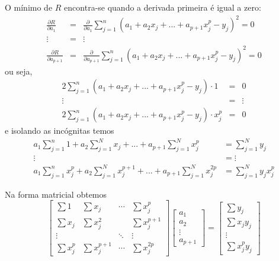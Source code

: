 O mínimo de $R$ encontra-se quando a derivada primeira é igual a zero:
\begin{eqnarray*}
  \frac{\partial R}{\partial a_1}     &=& \frac{\partial }{\partial a_1}     \sum_{j=1}^n (a_1 + a_2 x_j+...+a_{p+1}x_j^p-y_j)^2 =0 \\
  \vdots &=& \vdots \\
  \frac{\partial R}{\partial a_{p+1}} &=& \frac{\partial }{\partial a_{p+1}} \sum_{j=1}^n (a_1 + a_2 x_j+...+a_{p+1}x_j^p-y_j)^2 =0 
\end{eqnarray*}
ou seja,
\begin{eqnarray*}
   2 \sum_{j=1}^n (a_1 + a_2 x_j+...+a_{p+1}x_j^p-y_j)\cdot 1    &=&0 \\
  \vdots &=& \vdots \\
   2 \sum_{j=1}^n (a_1 + a_2 x_j+...+a_{p+1}x_j^p-y_j)\cdot x_j^p&=&0 
\end{eqnarray*}
e isolando as incógnitas temos
\begin{eqnarray*}
   a_1\sum_{j=1}^n 1     + a_2 \sum_{j=1}^Nx_j      +...+a_{p+1} \sum_{j=1}^Nx_j^{p} &=\sum_{j=1}^N y_j\\
  \vdots &= \vdots \\
   a_1\sum_{j=1}^n x_j^p + a_2 \sum_{j=1}^Nx_j^{p+1}+...+a_{p+1} \sum_{j=1}^Nx_j^{2p} &=\sum_{j=1}^N y_jx_j^{p}
\end{eqnarray*}

Na forma matricial obtemos
\begin{equation}
  \begin{bmatrix}
     \sum 1     &  \sum  x_j   & \cdots & \sum x_j^p\\
     \sum x_j   &  \sum  x_j^2 &        & \sum x_j^{p+1}\\
     \vdots     &              & \ddots & \vdots    \\
     \sum x_j^p &  \sum  x_j^{p+1} & \cdots & \sum x_j^{2p}
  \end{bmatrix}
  \begin{bmatrix}
     a_1 \\
     a_2 \\
     \vdots \\
     a_{p+1}
  \end{bmatrix}=
  \begin{bmatrix}
     \sum y_j \\
     \sum x_j y_j \\
     \vdots \\
     \sum x_j^p y_j 
  \end{bmatrix}
\end{equation}

